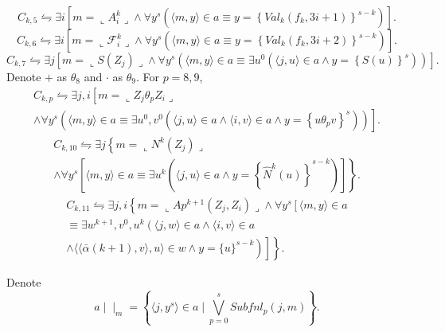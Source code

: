 \documentclass{asl}
\theoremstyle{definition}
\begin{document}
\[C_{k,5}\leftrightharpoons \exists i\left[m=\llcorner A^k_i\lrcorner \wedge\forall y^s\left(\langle m,y\rangle\in a \equiv y=\left\lbrace Val_k(f_k,3i+1) \right\rbrace^{s-k} \right) \right].\]
\[C_{k,6}\leftrightharpoons \exists i\left[m=\llcorner \mathcal{F}^k_i\lrcorner \wedge\forall y^s\left(\langle m,y\rangle\in a \equiv y=\left\lbrace Val_k(f_k,3i+2) \right\rbrace^{s-k} \right) \right].\]
\[C_{k,7}\leftrightharpoons 
\exists j\left[m=\llcorner S(Z_j)\lrcorner
\wedge\forall y^s\left(\langle m,y\rangle\in a \equiv 
\exists u^0\left(\langle j,u\rangle\in a\wedge y=\left\lbrace S(u) \right\rbrace^s \right)\right)\right].\]
Denote $+$ as $\theta_8$ and $\cdot$ as $\theta_9$. For $p=8,9$,
\begin{multline*}
C_{k,p}\leftrightharpoons 
\exists j,i\left[m=\llcorner Z_j\theta_p Z_i  \lrcorner \right.
\\
\left.
\wedge\forall y^s\left(\langle m,y\rangle\in a \equiv \exists u^0,v^0\left(\langle j,u\rangle\in a\wedge \langle i,v\rangle\in a\wedge y=\left\lbrace u\theta_p v \right\rbrace^s \right)\right)\right].
\end{multline*}
\begin{multline*}
C_{k,10}\leftrightharpoons \exists j\left\lbrace m=\llcorner N^k(Z_j)\lrcorner 
\right.
\\
\left.
\wedge\forall y^s\left[\langle m,y\rangle\in a \equiv \exists u^k
\left(\langle j,u\rangle\in a\wedge y=\left\lbrace \hat{N}^k(u) \right\rbrace^{s-k} \right)
 \right] \right\rbrace.
\end{multline*}
\begin{multline*}
C_{k,11}\leftrightharpoons \exists j,i\left\lbrace m=\llcorner Ap^{k+1}(Z_j,Z_i)\lrcorner\wedge\forall y^s\left[\langle m,y\rangle\in a \right.
\right.
\\
\left.
\left.
\equiv \exists w^{k+1}, v^0,u^{k}
\left(\langle j,w\rangle\in a\wedge 
\langle i,v\rangle\in a
\right.
\right.
\right.
\\
\left.
\left.
\left.
\wedge
\langle\langle\bar{\alpha}(k+1),v\rangle,u\rangle\in w
\wedge y=\lbrace u\rbrace^{s-k}\right)\right]\right\rbrace .
\end{multline*}

Denote 
\[a\mid\mid_m=\left\lbrace \langle j,y^s\rangle\in a\mid \bigvee_{p=0}^s Subfnl_p(j,m)\right\rbrace .\]
\end{document}
